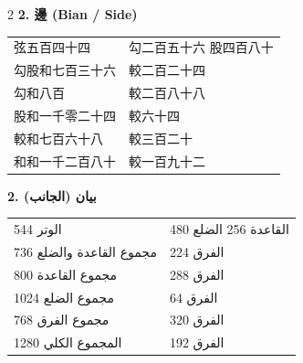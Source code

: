 \documentclass[11pt,a4paper]{article}
\newcommand{\ar}[1]{\arabicfont\beginR #1\endR}
\begin{document}
\vspace{0.3cm}

\begin{paracol}{2}
\textbf{2. 邊 (Bian / Side)}

\begin{center}
\begin{tabular}{ll}
弦五百四十四 & 勾二百五十六 \quad 股四百八十 \\
勾股和七百三十六 & 較二百二十四 \\
勾和八百 & 較二百八十八 \\
股和一千零二十四 & 較六十四 \\
較和七百六十八 & 較三百二十 \\
和和一千二百八十 & 較一百九十二 \\
\end{tabular}
\end{center}

\switchcolumn

\ar{\textbf{2. بيان (الجانب)}}

\begin{center}
\begin{tabular}{ll}
\ar{الوتر 544} & \ar{القاعدة 256 \quad الضلع 480} \\
\ar{مجموع القاعدة والضلع 736} & \ar{الفرق 224} \\
\ar{مجموع القاعدة 800} & \ar{الفرق 288} \\
\ar{مجموع الضلع 1024} & \ar{الفرق 64} \\
\ar{مجموع الفرق 768} & \ar{الفرق 320} \\
\ar{المجموع الكلي 1280} & \ar{الفرق 192} \\
\end{tabular}
\end{center}

\end{paracol}

\vspace{0.3cm}
\end{document}
